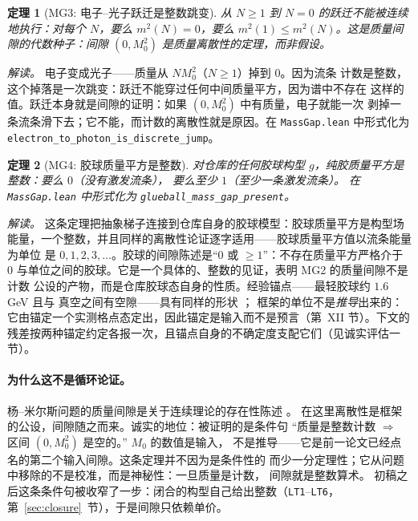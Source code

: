 \documentclass[aps,prd,preprint,superscriptaddress,amsmath,amssymb]{revtex4-2}
\newtheorem{theorem}{定理}[section]
\begin{document}
\begin{theorem}[MG3: 电子--光子跃迁是整数跳变]
\label{thm:mg3}
从 $N\ge1$ 到 $N=0$ 的跃迁不能被连续地执行：对每个 $N$，要么
$m^2(N)=0$，要么 $m^2(1)\le m^2(N)$。这是质量间隙的代数种子：间隙
$(0,M_0^2)$ 是质量离散性的定理，而非假设。
\end{theorem}

\emph{解读。} 电子变成光子——质量从 $N M_0^2$（$N\ge1$）掉到 $0$。因为流条
计数是整数，这个掉落是一次跳变：跃迁不能穿过任何中间质量平方，因为谱中不存在
这样的值。跃迁本身就是间隙的证明：如果 $(0,M_0^2)$ 中有质量，电子就能一次
剥掉一条流条滑下去；它不能，而计数的离散性就是原因。在 \texttt{MassGap.lean}
中形式化为 \texttt{electron\_to\_photon\_is\_discrete\_jump}。

\begin{theorem}[MG4: 胶球质量平方是整数]
\label{thm:mg4}
对仓库的任何胶球构型 $g$，纯胶质量平方是整数：要么 $0$（没有激发流条），
要么至少 $1$（至少一条激发流条）。
在 \texttt{MassGap.lean} 中形式化为
\texttt{glueball\_mass\_gap\_}\allowbreak\texttt{present}。
\end{theorem}

\emph{解读。} 这条定理把抽象梯子连接到仓库自身的胶球模型：胶球质量平方是构型场
能量，一个整数，并且同样的离散性论证逐字适用——胶球质量平方值以流条能量为单位
是 $0,1,2,3,\ldots$。胶球的间隙陈述是``$0$ 或 $\ge1$''：不存在质量平方严格介于
$0$ 与单位之间的胶球。它是一个具体的、整数的见证，表明 MG2 的质量间隙不是计数
公设的产物，而是仓库胶球态自身的性质。经验锚点——最轻胶球约 $1.6$ GeV 且与
真空之间有空隙——具有同样的形状
\cite{morningstar1999glueball,chen2006glueball}；
框架的单位不是\emph{推导}出来的：它由锚定一个实测格点态定出，因此锚定是输入而不是预言（第~XII 节）。下文的残差按两种锚定约定各报一次，且锚点自身的不确定度支配它们（见诚实评估一节）。

\paragraph{为什么这不是循环论证。}
杨--米尔斯问题的质量间隙是关于连续理论的存在性陈述 \cite{jaffe2000yang}。
在这里离散性是框架的公设，间隙随之而来。诚实的地位：被证明的是条件句
``质量是整数计数 $\Rightarrow$ 区间 $(0,M_0^2)$ 是空的。'' $M_0$ 的数值是输入，
不是推导——它是前一论文已经点名的第二个输入间隙。这条定理并不因为是条件性的
而少一分定理性；它从问题中移除的不是校准，而是神秘性：一旦质量是计数，
间隙就是整数算术。 初稿之后这条条件句被收窄了一步：闭合的构型自己给出整数（\texttt{LT1}--\texttt{LT6}，第~\ref{sec:closure}~节），于是间隙只依赖单价。
\end{document}

